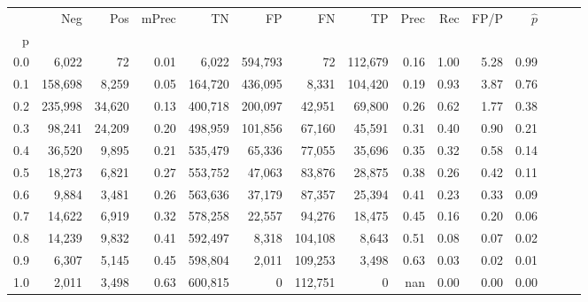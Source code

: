 \begin{tabular}{rrrrrrrrrrrrrrr}
\toprule
{} &      Neg &     Pos & mPrec &       TN &       FP &       FN &       TP &  Prec &   Rec &  FP/P & $\hat{p}$ \\
p   &          &         &       &          &          &          &          &       &       &       &           \\
\midrule
0.0 &    6,022 &      72 &  0.01 &    6,022 &  594,793 &       72 &  112,679 &  0.16 &  1.00 &  5.28 &      0.99 \\
0.1 &  158,698 &   8,259 &  0.05 &  164,720 &  436,095 &    8,331 &  104,420 &  0.19 &  0.93 &  3.87 &      0.76 \\
0.2 &  235,998 &  34,620 &  0.13 &  400,718 &  200,097 &   42,951 &   69,800 &  0.26 &  0.62 &  1.77 &      0.38 \\
0.3 &   98,241 &  24,209 &  0.20 &  498,959 &  101,856 &   67,160 &   45,591 &  0.31 &  0.40 &  0.90 &      0.21 \\
0.4 &   36,520 &   9,895 &  0.21 &  535,479 &   65,336 &   77,055 &   35,696 &  0.35 &  0.32 &  0.58 &      0.14 \\
0.5 &   18,273 &   6,821 &  0.27 &  553,752 &   47,063 &   83,876 &   28,875 &  0.38 &  0.26 &  0.42 &      0.11 \\
0.6 &    9,884 &   3,481 &  0.26 &  563,636 &   37,179 &   87,357 &   25,394 &  0.41 &  0.23 &  0.33 &      0.09 \\
0.7 &   14,622 &   6,919 &  0.32 &  578,258 &   22,557 &   94,276 &   18,475 &  0.45 &  0.16 &  0.20 &      0.06 \\
0.8 &   14,239 &   9,832 &  0.41 &  592,497 &    8,318 &  104,108 &    8,643 &  0.51 &  0.08 &  0.07 &      0.02 \\
0.9 &    6,307 &   5,145 &  0.45 &  598,804 &    2,011 &  109,253 &    3,498 &  0.63 &  0.03 &  0.02 &      0.01 \\
1.0 &    2,011 &   3,498 &  0.63 &  600,815 &        0 &  112,751 &        0 &   nan &  0.00 &  0.00 &      0.00 \\
\bottomrule
\end{tabular}
